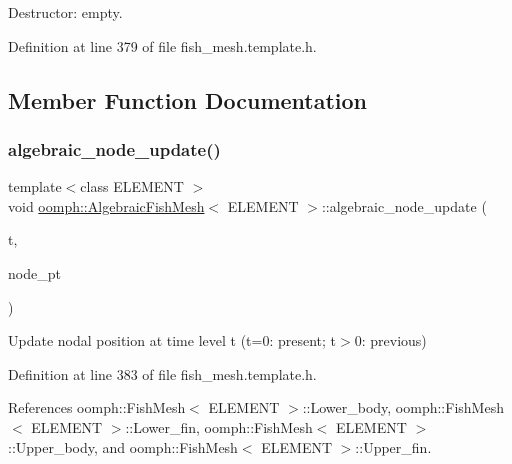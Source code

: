 Destructor\+: empty. 



Definition at line 379 of file fish\+\_\+mesh.\+template.\+h.



\subsection{Member Function Documentation}
\mbox{\label{classoomph_1_1AlgebraicFishMesh_ac66d6542472dac702a7414aa9d7f995f}} 
\subsubsection{\texorpdfstring{algebraic\+\_\+node\+\_\+update()}{algebraic\_node\_update()}}
{\footnotesize\ttfamily template$<$class E\+L\+E\+M\+E\+NT $>$ \\
void \hyperlink{classoomph_1_1AlgebraicFishMesh}{oomph\+::\+Algebraic\+Fish\+Mesh}$<$ E\+L\+E\+M\+E\+NT $>$\+::algebraic\+\_\+node\+\_\+update (\begin{DoxyParamCaption}\item[{const unsigned \&}]{t,  }\item[{Algebraic\+Node $\ast$\&}]{node\+\_\+pt }\end{DoxyParamCaption})\hspace{0.3cm}{\ttfamily [inline]}}



Update nodal position at time level t (t=0\+: present; t$>$0\+: previous) 



Definition at line 383 of file fish\+\_\+mesh.\+template.\+h.



References oomph\+::\+Fish\+Mesh$<$ E\+L\+E\+M\+E\+N\+T $>$\+::\+Lower\+\_\+body, oomph\+::\+Fish\+Mesh$<$ E\+L\+E\+M\+E\+N\+T $>$\+::\+Lower\+\_\+fin, oomph\+::\+Fish\+Mesh$<$ E\+L\+E\+M\+E\+N\+T $>$\+::\+Upper\+\_\+body, and oomph\+::\+Fish\+Mesh$<$ E\+L\+E\+M\+E\+N\+T $>$\+::\+Upper\+\_\+fin.

\mbox{\label{classoomph_1_1AlgebraicFishMesh_a39cd5a86b0f762efd09f4fefba6da1c3}} 

